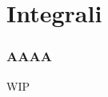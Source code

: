 \documentclass[10pt, a4paper]{article}
\begin{document}
\begin{center}
{\begin{tabular}{ |p{5em} | p{5em} | p{5em} | p{7em} | p{2cm}| }
                \hline
                
            \end{tabular}
        }
    \end{center}

    \newpage
    \part{Integrali}
    \section{AAAA}
    \huge{WIP}
\end{document}
